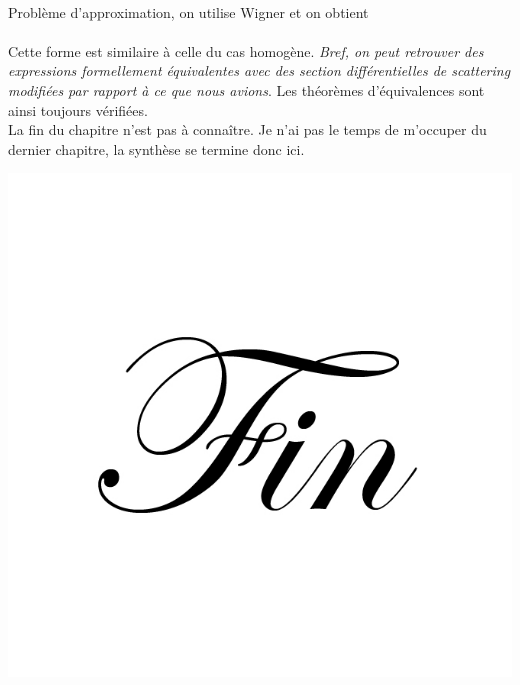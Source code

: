 	\ \\
	
	Problème d'approximation, on utilise Wigner et on obtient\\
	
	\ \\
	
	Cette forme est similaire à celle du cas homogène. \textit{Bref, on peut retrouver des 
	expressions formellement équivalentes avec des section différentielles de scattering modifiées 
	par rapport à ce que nous avions}. Les théorèmes d'équivalences sont ainsi toujours vérifiées.\\
	
	La fin du chapitre n'est pas à connaître. Je n'ai pas le temps de m'occuper du dernier chapitre, 
	la synthèse se termine donc ici.
	
	\vspace{4cm}
	\begin{center}
	\includegraphics[scale=0.2]{ch8/fin}
	\end{center}